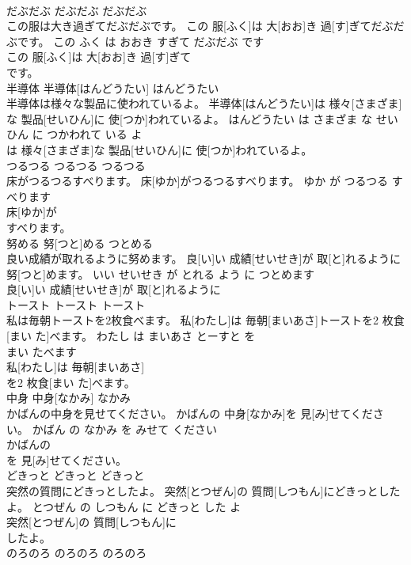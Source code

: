 \documentclass[8pt]{extreport}
\begin{document}
\begin{CJK}{UTF8}{min}
\\	だぶだぶ	だぶだぶ	だぶだぶ	
\\	この服は大き過ぎてだぶだぶです。	この 服[ふく]は 大[おお]き 過[す]ぎてだぶだぶです。	この ふく は おおき すぎて だぶだぶ です	
\\	この 服[ふく]は 大[おお]き 過[す]ぎて
\\	です。			
\\	半導体	半導体[はんどうたい]	はんどうたい	
\\	半導体は様々な製品に使われているよ。	半導体[はんどうたい]は 様々[さまざま]な 製品[せいひん]に 使[つか]われているよ。	はんどうたい は さまざま な せいひん に つかわれて いる よ	
\\	は 様々[さまざま]な 製品[せいひん]に 使[つか]われているよ。			
\\	つるつる	つるつる	つるつる	
\\	床がつるつるすべります。	床[ゆか]がつるつるすべります。	ゆか が つるつる すべります	
\\	床[ゆか]が
\\	すべります。			
\\	努める	努[つと]める	つとめる	
\\	良い成績が取れるように努めます。	良[い]い 成績[せいせき]が 取[と]れるように 努[つと]めます。	いい せいせき が とれる よう に つとめます	
\\	良[い]い 成績[せいせき]が 取[と]れるように
\\	トースト	トースト	トースト	
\\	私は毎朝トーストを2枚食べます。	私[わたし]は 毎朝[まいあさ]トーストを2 枚食[まい た]べます。	わたし は まいあさ とーすと を 
\\	まい たべます	
\\	私[わたし]は 毎朝[まいあさ]
\\	を2 枚食[まい た]べます。			
\\	中身	中身[なかみ]	なかみ	
\\	かばんの中身を見せてください。	かばんの 中身[なかみ]を 見[み]せてください。	かばん の なかみ を みせて ください	
\\	かばんの
\\	を 見[み]せてください。			
\\	どきっと	どきっと	どきっと	
\\	突然の質問にどきっとしたよ。	突然[とつぜん]の 質問[しつもん]にどきっとしたよ。	とつぜん の しつもん に どきっと した よ	
\\	突然[とつぜん]の 質問[しつもん]に
\\	したよ。			
\\	のろのろ	のろのろ	のろのろ	

\end{CJK}
\end{document}
